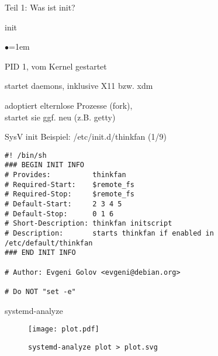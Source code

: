 \documentclass[xetex,serif,compress]{beamer}
\begin{document}
\newcommand{\mslide}[2]{
    \begin{frame}{#1}
        \begin{list}{$\bullet$}{\itemsep=1em}
            #2
        \end{list}
    \end{frame}
}


\begin{frame}{}
\begin{center}
{\Huge Teil 1: Was ist init?}
\end{center}
\end{frame}

\mslide{init}{
	\item PID 1, vom Kernel gestartet
	\item startet daemons, inklusive X11 bzw. xdm
	\item adoptiert elternlose Prozesse (fork),\\
    startet sie ggf. neu (z.B. getty)
}

\begin{frame}[fragile]{SysV init Beispiel: /etc/init.d/thinkfan (1/9)}
\begin{verbatim}
#! /bin/sh
### BEGIN INIT INFO
# Provides:          thinkfan
# Required-Start:    $remote_fs
# Required-Stop:     $remote_fs
# Default-Start:     2 3 4 5
# Default-Stop:      0 1 6
# Short-Description: thinkfan initscript
# Description:       starts thinkfan if enabled in /etc/default/thinkfan
### END INIT INFO

# Author: Evgeni Golov <evgeni@debian.org>

# Do NOT "set -e"
\end{verbatim}
\end{frame}

\begin{frame}[fragile]{systemd-analyze}
    \begin{figure}
    \texttt{[image: plot.pdf]}
    \caption{\texttt{systemd-analyze plot > plot.svg}}
    \end{figure}
\end{frame}
\end{document}
